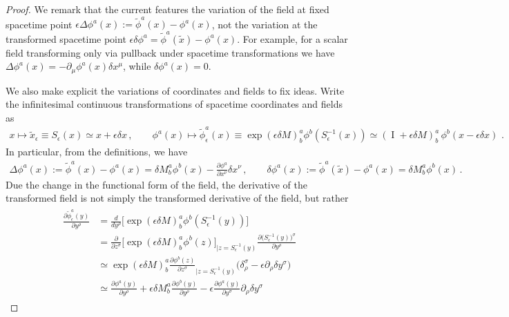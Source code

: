 \documentclass[../QFT_main.tex]{subfiles}
\begin{document}
%
\begin{proof}
We remark that the current features the variation of the field at fixed spacetime point {\small$\epsilon\Delta \phi^a(x):=\tilde{\phi}^a(x)-\phi^a(x)$}, not the variation at the transformed spacetime point $\epsilon\delta \phi^a=\tilde{\phi}^a(\tilde{x})-\phi^a(x)$.
For example, for a scalar field transforming only via pullback under spacetime transformations we have $\Delta \phi^a(x)=-\partial_\mu \phi^a(x)\delta x^\mu$, while $\delta \phi^a(x)=0$.

We also make explicit the variations of coordinates and fields to fix ideas.
Write the infinitesimal continuous transformations of spacetime coordinates and fields as
{\small\begin{align}
    x \mapsto \tilde{x}_\epsilon\equiv S_\epsilon(x)\simeq x+\epsilon \delta x\,,\qquad 
    \phi^a(x)\mapsto \tilde{\phi}_\epsilon^a(x)\equiv \exp(\epsilon \delta M)^a_b\phi^b(S_\epsilon^{-1}(x))\simeq (\operatorname{I}+\epsilon \delta M)^a_b \,\phi^b(x-\epsilon \delta x)\,\,.
\end{align}}
In particular, from the definitions, we have
{\small\begin{align}
    \Delta\phi^a(x):=\tilde{\phi}^a(x)-\phi^a(x) = \delta M^a_b \phi^b(x)-\tfrac{\partial \phi^a}{\partial x^\nu} \delta x^\nu\,,
    \qquad
    \delta\phi^a(x):=\tilde{\phi}^a(\tilde{x})-\phi^a(x) = \delta M^a_b \phi^b(x)\,.
\end{align}}
Due the change in the functional form of the field, the derivative of the transformed field is not simply the transformed derivative of the field, but rather
{\small\begin{align}
\begin{aligned}
   \tfrac{\partial\tilde{\phi}_\epsilon^a(y)}{\partial y^\rho}
   &=\tfrac{d}{dy^\rho}\big[\exp(\epsilon\delta M)^a_b \phi^b(S_\epsilon^{-1}(y))\big]
   \\
   &=
   \tfrac{\partial }{\partial z^\sigma}\big[\exp(\epsilon\delta M)^a_b \phi^b(z)\big]_{\mid z=S_\epsilon^{-1}(y)}\tfrac{\partial (S_{\epsilon}^{-1}(y)\big)^\sigma}{\partial y^\rho}
   \\
    &\simeq
    \exp(\epsilon\delta M)^a_b \tfrac{\partial \phi^b(z)}{\partial z^\sigma}_{\mid z=S_\epsilon^{-1}(y)}\big(\delta_\rho^\sigma-\epsilon \partial_\rho\delta y^\sigma\big)
    \\
    &\simeq 
    \tfrac{\partial \phi^a(y)}{\partial y^\rho}
    +\epsilon \delta M^a_b \tfrac{\partial \phi^b(y)}{\partial y^\rho}
    -\epsilon \tfrac{\partial \phi^a(y)}{\partial y^\sigma}\partial_\rho\delta y^\sigma

\end{aligned}
\end{align}}
\end{proof}
\end{document}
